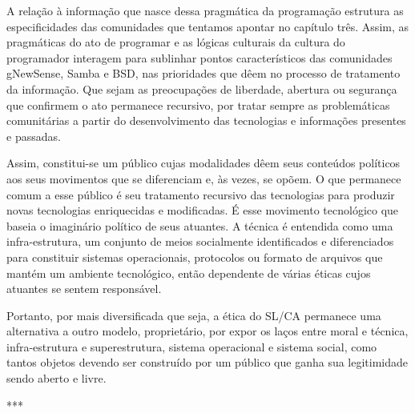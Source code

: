 A relação à informação que nasce dessa pragmática da programação estrutura as especificidades das comunidades que tentamos apontar no capítulo três. Assim, as pragmáticas do ato de programar e as lógicas culturais da cultura do programador interagem para sublinhar pontos característicos das comunidades gNewSense, Samba e BSD, nas prioridades que dêem no processo de tratamento da informação. Que sejam as preocupações de liberdade, abertura ou segurança que confirmem o ato permanece recursivo, por tratar sempre as problemáticas comunitárias a partir do desenvolvimento das tecnologias e informações presentes e passadas.

Assim, constitui-se um público cujas modalidades dêem seus conteúdos políticos aos seus movimentos que se diferenciam e, às vezes, se opõem. O que permanece comum a esse público é seu tratamento recursivo das tecnologias para produzir novas tecnologias enriquecidas e modificadas. É esse movimento tecnológico que baseia o imaginário político de seus atuantes. A técnica é entendida como uma infra-estrutura, um conjunto de meios socialmente identificados e diferenciados para constituir sistemas operacionais, protocolos ou formato de arquivos que mantém um ambiente tecnológico, então dependente de várias éticas cujos atuantes se sentem responsável. 

Portanto, por mais diversificada que seja, a ética do SL/CA permanece uma alternativa a outro modelo, proprietário, por expor os laços entre moral e técnica, infra-estrutura e superestrutura, sistema operacional e sistema social, como tantos objetos devendo ser construído por um público que ganha sua legitimidade sendo aberto e livre.

\vspace{1cm}

\begin{center}
***
\end{center}

